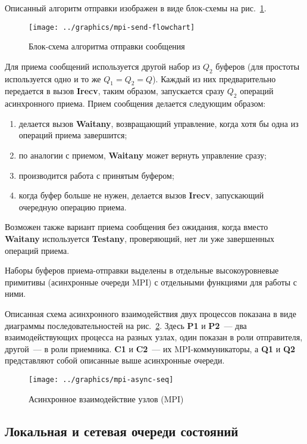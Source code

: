 \documentclass[12pt,a4paper,fleqn]{article}
\newcommand{\Code}[1]{\textbf{\mbox{#1}}}
\begin{document}
Описанный алгоритм отправки изображен в виде блок-схемы на рис.~\ref{fig:mpi-send-flowchart}.

\begin{figure}[!tb]
  \centering
  \texttt{[image: ../graphics/mpi-send-flowchart]}
  \caption{Блок-схема алгоритма отправки сообщения}
  \label{fig:mpi-send-flowchart}
\end{figure}

Для приема сообщений используется другой набор из $Q_2$ буферов (для простоты используется
одно и то же $Q_1 = Q_2 = Q$). Каждый из них предварительно передается в вызов
\Code{Irecv}, таким образом, запускается сразу $Q_2$ операций асинхронного приема. Прием
сообщения делается следующим образом:
\begin{enumerate}
\item делается вызов \Code{Waitany}, возвращающий управление, когда хотя бы одна из
  операций приема завершится;
\item по аналогии с приемом, \Code{Waitany} может вернуть управление сразу;
\item производится работа с принятым буфером;
\item когда буфер больше не нужен, делается вызов \Code{Irecv}, запускающий очередную
  операцию приема.
\end{enumerate}

Возможен также вариант приема сообщения без ожидания, когда вместо \Code{Waitany} используется
\Code{Testany}, проверяющий, нет ли уже завершенных операций приема.

Наборы буферов приема-отправки выделены в отдельные высокоуровневые примитивы (асинхронные
очереди MPI) с отдельными функциями для работы с ними.

Описанная схема асинхронного взаимодействия двух процессов показана в виде диаграммы
последовательностей на рис.~\ref{fig:mpi-async-seq}. Здесь \Code{P1} и \Code{P2}~--- два
взаимодействующих процесса на разных узлах, один показан в роли отправителя, другой~--- в роли
приемника. \Code{C1} и \Code{C2}~--- их MPI-коммуникаторы, а \Code{Q1} и \Code{Q2} представляют
собой описанные выше асинхронные очереди.

\begin{figure}[ht]
  \centering
  \texttt{[image: ../graphics/mpi-async-seq]}  
  \caption{Асинхронное взаимодействие узлов (MPI)}
  \label{fig:mpi-async-seq}
\end{figure}

\subsection{Локальная и сетевая очереди состояний}
\end{document}
